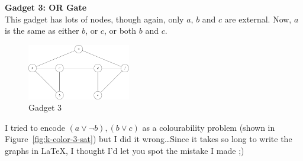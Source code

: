 \begin{description}
  \item \textbf{Gadget 3: OR Gate}\\
    This gadget has lots of nodes, though again, only $a$, $b$ and $c$ are 
    external. Now, $a$ is the same as either $b$, or $c$, or both $b$ and $c$.

    \begin{figure}[H]
      \centering
      \includegraphics[width=0.4\textwidth]{diagrams/graph13}
      \caption{Gadget 3}
      \label{fig:gadget3}
    \end{figure}
\end{description}

I tried to encode $(a \vee \neg b), (b \vee c)$ as a colourability problem (shown
in Figure~\ref{fig:k-color-3-sat}) but I did it wrong\dots Since it takes so
long to write the graphs in \LaTeX, I thought I'd let you spot the mistake I
made ;)

